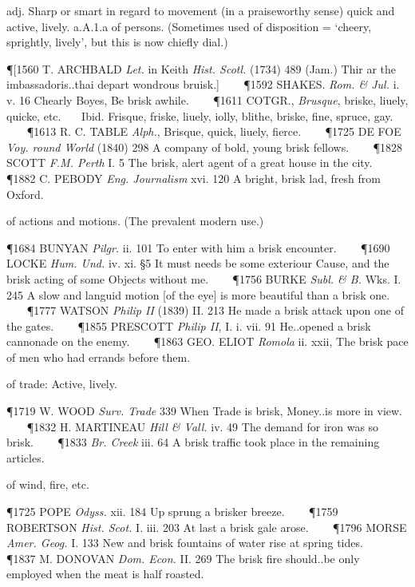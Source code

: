 \begin{description}[wide, labelwidth=!, labelindent=0pt]
\begin{myenumerate}
 adj.
 Sharp or smart in regard to movement (in a praiseworthy sense) quick and active, lively. a.A.1.a of persons. (Sometimes used of disposition = ‘cheery, sprightly, lively’, but this is now chiefly dial.)

\P [1560 T. ARCHBALD  \textit{Let.} in Keith \textit{Hist. Scotl.} (1734) 489 (Jam.) Thir ar the imbassadoris..thai depart wondrous bruisk.]    
\P 1592 SHAKES.  \textit{Rom. \& Jul.} i. v. 16 Chearly Boyes, Be brisk awhile.    
\P 1611 COTGR.,  \textit{Brusque}, briske, liuely, quicke, etc.    Ibid. Frisque, friske, liuely, iolly, blithe, briske, fine, spruce, gay.    
\P 1613 R. C. TABLE  \textit{Alph.}, Brisque, quick, liuely, fierce.    
\P 1725 DE FOE  \textit{Voy. round World} (1840) 298 A company of bold, young brisk fellows.    
\P 1828 SCOTT  \textit{F.M. Perth} I. 5 The brisk, alert agent of a great house in the city.    
\P 1882 C. PEBODY  \textit{Eng. Journalism} xvi. 120 A bright, brisk lad, fresh from Oxford.

 of actions and motions. (The prevalent modern use.)

\P 1684 BUNYAN  \textit{Pilgr.} ii. 101 To enter with him a brisk encounter.    
\P 1690 LOCKE  \textit{Hum. Und.} iv. xi. §5 It must needs be some exteriour Cause, and the brisk acting of some Objects without me.    
\P 1756 BURKE  \textit{Subl. \& B.} Wks. I. 245 A slow and languid motion [of the eye] is more beautiful than a brisk one.    
\P 1777 WATSON  \textit{Philip II} (1839) II. 213 He made a brisk attack upon one of the gates.    
\P 1855 PRESCOTT  \textit{Philip II}, I. i. vii. 91 He..opened a brisk cannonade on the enemy.    
\P 1863 GEO. ELIOT  \textit{Romola} ii. xxii, The brisk pace of men who had errands before them.

 of trade: Active, lively.

\P 1719 W. WOOD  \textit{Surv. Trade} 339 When Trade is brisk, Money..is more in view.    
\P 1832 H. MARTINEAU  \textit{Hill \& Vall.} iv. 49 The demand for iron was so brisk.    
\P 1833   \textit{Br. Creek} iii. 64 A brisk traffic took place in the remaining articles.

 of wind, fire, etc.

\P 1725 POPE  \textit{Odyss.} xii. 184 Up sprung a brisker breeze.    
\P 1759 ROBERTSON  \textit{Hist. Scot.} I. iii. 203 At last a brisk gale arose.    
\P 1796 MORSE  \textit{Amer. Geog.} I. 133 New and brisk fountains of water rise at spring tides.    
\P 1837 M. DONOVAN  \textit{Dom. Econ.} II. 269 The brisk fire should..be only employed when the meat is half roasted.


\end{myenumerate}
\end{description}
